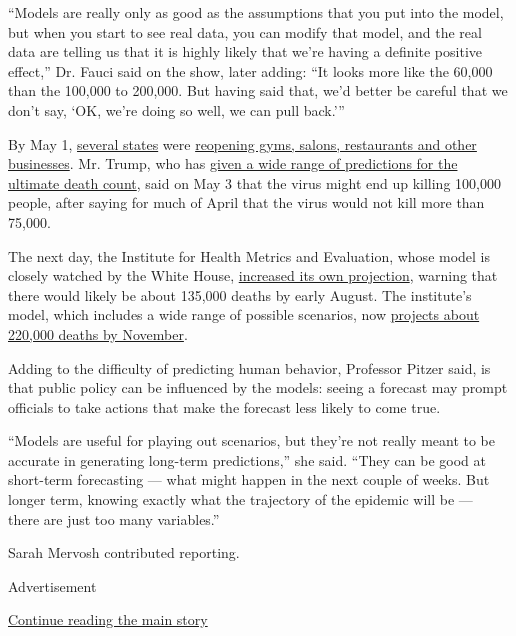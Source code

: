 ``Models are really only as good as the assumptions that you put into
the model, but when you start to see real data, you can modify that
model, and the real data are telling us that it is highly likely that
we're having a definite positive effect,'' Dr. Fauci said on the show,
later adding: ``It looks more like the 60,000 than the 100,000 to
200,000. But having said that, we'd better be careful that we don't say,
`OK, we're doing so well, we can pull back.'''

By May 1,
\href{https://www.nytimes3xbfgragh.onion/2020/04/20/us/coronavirus-us-hot-spots-reopening.html}{several
states} were
\href{https://www.nytimes3xbfgragh.onion/interactive/2020/us/states-reopen-map-coronavirus.html}{reopening
gyms, salons, restaurants and other businesses}. Mr. Trump, who has
\href{https://www.cnn.com/2020/05/04/politics/trump-rising-coronavirus-death-estimates/index.html}{given
a wide range of predictions for the ultimate death count}, said on May 3
that the virus might end up killing 100,000 people, after saying for
much of April that the virus would not kill more than 75,000.

The next day, the Institute for Health Metrics and Evaluation, whose
model is closely watched by the White House,
\href{http://www.healthdata.org/news-release/new-ihme-forecast-projects-nearly-135000-covid-19-deaths-us}{increased
its own projection}, warning that there would likely be about 135,000
deaths by early August. The institute's model, which includes a wide
range of possible scenarios, now
\href{https://covid19.healthdata.org/united-states-of-america}{projects
about 220,000 deaths by November}.

Adding to the difficulty of predicting human behavior, Professor Pitzer
said, is that public policy can be influenced by the models: seeing a
forecast may prompt officials to take actions that make the forecast
less likely to come true.

``Models are useful for playing out scenarios, but they're not really
meant to be accurate in generating long-term predictions,'' she said.
``They can be good at short-term forecasting --- what might happen in
the next couple of weeks. But longer term, knowing exactly what the
trajectory of the epidemic will be ---~ there are just too many
variables.''

Sarah Mervosh contributed reporting.

Advertisement

\protect\hyperlink{after-bottom}{Continue reading the main story}


